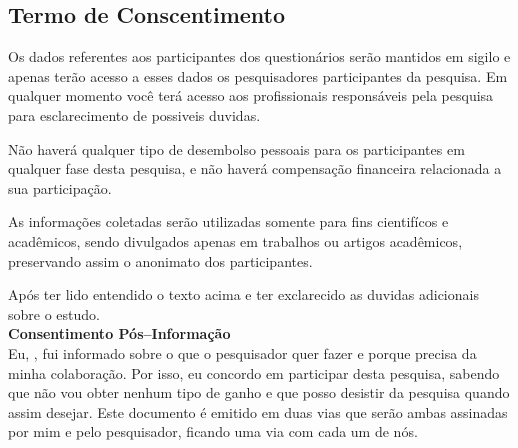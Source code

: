 \subsection{Termo de Conscentimento}

Os dados referentes aos participantes dos questionários serão mantidos em sigilo e apenas terão acesso a esses dados os pesquisadores participantes da pesquisa.	
Em qualquer momento você terá acesso aos profissionais responsáveis pela pesquisa para esclarecimento de possiveis duvidas.

Não haverá qualquer tipo de desembolso pessoais para os participantes em qualquer fase desta pesquisa, e não haverá compensação financeira relacionada a sua participação.

As informações coletadas serão utilizadas somente para fins cientifícos e acadêmicos, sendo divulgados apenas em trabalhos ou artigos acadêmicos, preservando assim o anonimato dos participantes.
	
Após ter lido entendido o texto acima e ter exclarecido as duvidas adicionais sobre o estudo. \\


\textbf{Consentimento Pós–Informação} \\

Eu,                        , fui informado
sobre o que o pesquisador quer fazer e porque precisa da minha colaboração.
 Por isso, eu concordo em participar desta pesquisa, sabendo que não vou obter nenhum tipo de ganho
e que posso desistir da pesquisa quando assim desejar. Este documento é emitido em duas vias que serão ambas
assinadas por mim e pelo pesquisador, ficando uma via com cada um de nós.
